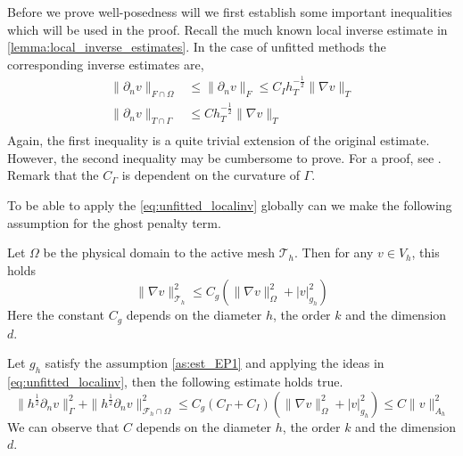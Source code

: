 Before we prove well-posedness will we first establish some important inequalities which will be used in the proof.
Recall the much known local inverse estimate in \ref{lemma:local_inverse_estimates}. In the case of unfitted methods the corresponding inverse estimates are,
\begin{equation}
\label{eq:unfitted_localinv}
\begin{split}
    \| \partial _{n} v \|_{ F\cap \Omega  }^{  } & \le \| \partial _{n}  v \|_{F  }^{  } \le  C_{I} h_{T} ^{-\frac{1}{2}} \| \nabla v \|_{ T }^{  } \\
    \| \partial _{n} v \|_{ T\cap \Gamma   }^{  } &  \le  C h_{T} ^{-\frac{1}{2}} \| \nabla v \|_{ T }^{  } \\
\end{split}
\end{equation}
Again, the first inequality is a quite trivial extension of the original estimate. However, the second inequality may be cumbersome to prove. For a proof, see \cite{hansbo2003finite}. Remark that the $C_{\Gamma } $ is dependent on the curvature of $\Gamma $. 

To be able to apply the \eqref{eq:unfitted_localinv} globally can we make the following assumption for the ghost penalty term.

\begin{assumption}[EP1]
    \label{as:est_EP1}
    Let $\Omega $ be the physical domain to the active mesh $\mathcal{T} _{h}$. Then for any $v \in V_{h}$, this holds \[
    \| \nabla v \|_{ \mathcal{T}_{h}  }^{ 2 }  \le C_{g} ( \| \nabla v \|_{ \Omega  }^{ 2 }  + \left\lvert v  \right\rvert _{ g_{h} }^{ 2 } )
    \]
    Here the constant $C_{g}$ depends on the diameter $h$, the order $k $ and the dimension $d$.
\end{assumption}


\begin{corollary}
    \label{cor:g_h_inverste_results}
    Let $g_{h}$ satisfy the assumption \ref{as:est_EP1} and applying the ideas in \eqref{eq:unfitted_localinv}, then the following estimate holds true.
    \[
    \| h^{\frac{1}{2}} \partial _{n} v \|_{ \Gamma   }^{ 2 } + \| h^{\frac{1}{2}} \partial _{n} v \|_{ \mathcal{F} _{h} \cap \Omega  }^{ 2 }  \le  C_{g}( C_{\Gamma } + C_{I}) ( \| \nabla v  \|_{ \Omega   }^{2  }
     + \left\lvert v \right\rvert _{g_{h}}^{2}) \le C \| v \|_{ A_{h} }^{ 2 }
    \]
    We can observe that $C$ depends on the diameter $h$, the order $k $ and the dimension $d$.
\end{corollary}

